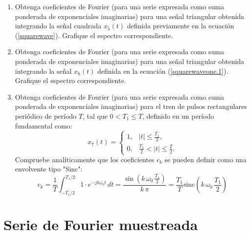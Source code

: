 \documentclass[11pt,a4paper,openany]{book}
\begin{document}
\begin{enumerate}
	\item Obtenga coeficientes de Fourier (para una serie expresada como suma ponderada de exponenciales imaginarias) para una señal triangular obtenida integrando la señal cuadrada $x_{5}(t)$ definida previamente en la ecuación (\ref{squarewave}). Grafique el espectro correspondiente.
	
	\item Obtenga coeficientes de Fourier (para una serie expresada como suma ponderada de exponenciales imaginarias) para una señal triangular obtenida integrando la señal $x_{6}(t)$ definida en la ecuación (\ref{squarewaveone.1}). Grafique el espectro correspondiente.
	
	\item Obtenga coeficientes de Fourier (para una serie expresada como suma ponderada de exponenciales imaginarias) para el tren de pulsos rectangulares periódico de período $T$, tal que $0 < T_{1} \leq T$, definido en un período fundamental como:
	\begin{equation}
		x_{7}(t) = \begin{cases}
			1, & |t| \leq \frac{T_{1}}{2}, \\
			0, & \frac{T_{1}}{2} < |t| \leq \frac{T}{2}.
		\end{cases}
	\end{equation}
	Compruebe analíticamente que los coeficientes $c_k$ se pueden definir como una envolvente tipo "Sinc":
	\begin{equation}
		c_{k} = \frac{1}{T} \int_{-T_1/2}^{T_1/2} 1 \cdot e^{-j k \omega_0 t} \, dt = \frac{\sin\left(k \, \omega_0 \, \frac{T_{1}}{2}\right)}{k \, \pi} = \frac{T_1}{T} \text{sinc}\left(k \, \omega_0 \, \frac{T_1}{2}\right)
	\end{equation}
\end{enumerate}

\section{Serie de Fourier muestreada}



\end{document}
